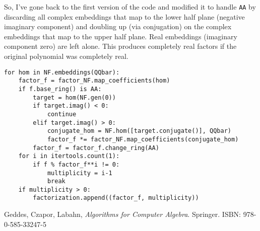 \documentclass{article}
\begin{document}
So, I've gone back to the first version of the code and modified it to
handle {\tt AA} by discarding all complex embeddings that map to the
lower half plane (negative imaginary component) and doubling up
(via conjugation) on the complex embeddings that map to the upper
half plane.  Real embeddings (imaginary component zero) are left
alone.  This produces completely real factors if the original
polynomial was completely real.

\begin{verbatim}
for hom in NF.embeddings(QQbar):
    factor_f = factor_NF.map_coefficients(hom)
    if f.base_ring() is AA:
        target = hom(NF.gen(0))
        if target.imag() < 0:
            continue
        elif target.imag() > 0:
            conjugate_hom = NF.hom([target.conjugate()], QQbar)
            factor_f *= factor_NF.map_coefficients(conjugate_hom)
        factor_f = factor_f.change_ring(AA)
    for i in itertools.count(1):
        if f % factor_f**i != 0:
            multiplicity = i-1
            break
    if multiplicity > 0:
        factorization.append((factor_f, multiplicity))
\end{verbatim}



\begin{thebibliography}{9}

Geddes, Czapor, Labahn, {\it Algorithms for Computer Algebra}. Springer.
ISBN: 978-0-585-33247-5

\end{thebibliography}
\end{document}
